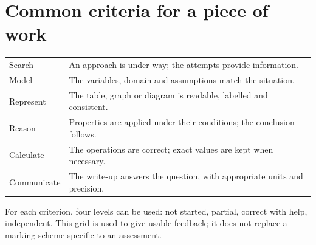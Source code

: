 \section*{Common criteria for a piece of work}
\begin{center}\small\renewcommand{\arraystretch}{1.6}\begin{tabularx}{\linewidth}{l X}
Search&An approach is under way; the attempts provide information.\\
Model&The variables, domain and assumptions match the situation.\\
Represent&The table, graph or diagram is readable, labelled and consistent.\\
Reason&Properties are applied under their conditions; the conclusion follows.\\
Calculate&The operations are correct; exact values are kept when necessary.\\
Communicate&The write-up answers the question, with appropriate units and precision.
\end{tabularx}\end{center}
For each criterion, four levels can be used: not started, partial, correct with help, independent. This grid is used to give usable feedback; it does not replace a marking scheme specific to an assessment.

